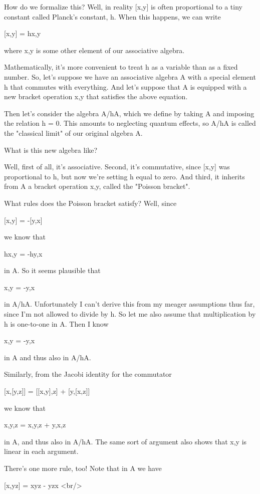 How do we formalize this?  Well, in reality [x,y] is often
proportional to a tiny constant called Planck's constant, h.  
When this happens, we can write

[x,y] = h{x,y}

where {x,y} is some other element of our associative algebra.  

Mathematically, it's more convenient to treat h as a variable than
as a fixed number. 
So, let's suppose we have an associative algebra A with a special
element h that commutes with everything.  
And let's suppose that A is
equipped with a new bracket operation {x,y} that satisfies the above
equation.

Then let's consider the algebra A/hA, which we define by taking A and
imposing the relation h = 0.  This amounts to neglecting quantum
effects, so A/hA is called the "classical limit" of our original
algebra A.  

What is this new algebra like?

Well, first of all, it's associative.  Second, it's commutative, since
[x,y] was proportional to h, but now we're setting h equal to zero.
And third, it inherits from A a bracket operation {x,y}, called the
"Poisson bracket".

What rules does the Poisson bracket satisfy?  Well, since 

[x,y] = -[y,x]

we know that

h{x,y} = -h{y,x}

in A.  So it seems plausible that

{x,y} = -{y,x}

in A/hA.  Unfortunately I can't derive this from my meager assumptions
thus far, since I'm not allowed to divide by h.  So let me also assume
that multiplication by h is one-to-one in A.  Then I know

{x,y} = -{y,x}

in A and thus also in A/hA.

Similarly, from the Jacobi identity for the commutator

[x,[y,z]] = [[x,y],z] + [y,[x,z]]

we know that

{x,{y,z}} = {{x,y},z} + {y,{x,z}}

in A, and thus also in A/hA.  The same sort of argument also shows
that {x,y} is linear in each argument.

There's one more rule, too!  Note that in A we have

[x,yz] = xyz - yzx <br/>
        
